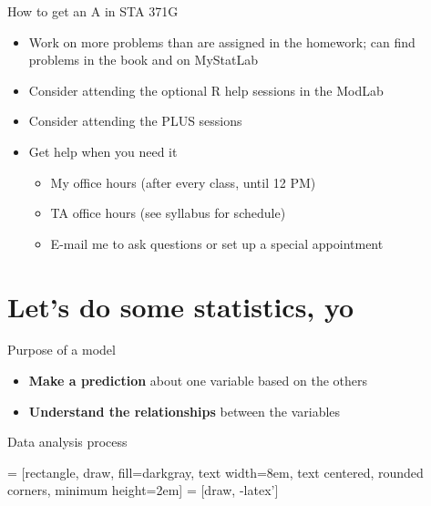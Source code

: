 \documentclass{beamer}\usepackage[]{graphicx}\usepackage[]{color}
\begin{document}
\begin{darkframes}
    \begin{frame}{How to get an A in STA 371G}
      \begin{itemize}
        \item Work on more problems than are assigned in the homework; can find problems in the book and on MyStatLab
        \item Consider attending the optional R help sessions in the ModLab
        \item Consider attending the PLUS sessions
        \item Get help when you need it
          \begin{itemize}
            \item My office hours (after every class, until 12 PM)
            \item TA office hours (see syllabus for schedule)
            \item E-mail me to ask questions or set up a special appointment
          \end{itemize}
      \end{itemize}
    \end{frame}

    \section{Let's do some statistics, yo}

    \begin{frame}{Purpose of a model}
      \begin{itemize}
        \item \textbf{Make a prediction} about one variable based on the others
        \item \textbf{Understand the relationships} between the variables
      \end{itemize}
    \end{frame}

    \begin{frame}{Data analysis process}
      \begin{center}
         = [rectangle, draw, fill=darkgray,
            text width=8em, text centered, rounded corners, minimum height=2em]
         = [draw, -latex']

      \end{center}
    \end{frame}


\end{darkframes}
\end{document}
